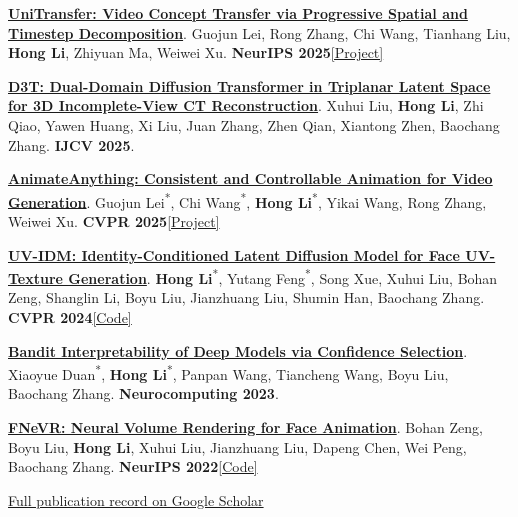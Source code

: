 \documentclass[10pt,a4paper]{article}
\newcommand{\EqContrib}{\textsuperscript{*}}
\newcommand{\reslink}[2]{\href{#1}{\textcolor{accent}{[#2]}}}
\begin{document}
\begin{enumerate}[leftmargin=1.6em,label={[\arabic*]},topsep=6pt,itemsep=7pt,parsep=0pt]
\item \href{https://yu-shaonian.github.io/UniTransfer-Web/}{\textbf{UniTransfer: Video Concept Transfer via Progressive Spatial and Timestep Decomposition}}. Guojun Lei, Rong Zhang, Chi Wang, Tianhang Liu, \textbf{Hong Li}, Zhiyuan Ma, Weiwei Xu. \textcolor{accent}{\textbf{NeurIPS 2025}}\enspace \reslink{https://yu-shaonian.github.io/UniTransfer-Web/}{Project}

\item \href{https://link.springer.com/article/10.1007/s11263-025-02426-2}{\textbf{D3T: Dual-Domain Diffusion Transformer in Triplanar Latent Space for 3D Incomplete-View CT Reconstruction}}. Xuhui Liu, \textbf{Hong Li}, Zhi Qiao, Yawen Huang, Xi Liu, Juan Zhang, Zhen Qian, Xiantong Zhen, Baochang Zhang. \textcolor{accent}{\textbf{IJCV 2025}}.

\item \href{https://yu-shaonian.github.io/Animate_Anything/}{\textbf{AnimateAnything: Consistent and Controllable Animation for Video Generation}}. Guojun Lei\EqContrib, Chi Wang\EqContrib, \textbf{Hong Li}\EqContrib, Yikai Wang, Rong Zhang, Weiwei Xu. \textcolor{accent}{\textbf{CVPR 2025}}\enspace \reslink{https://yu-shaonian.github.io/Animate_Anything/}{Project}

\item \href{https://openaccess.thecvf.com/content/CVPR2024/papers/Li_UV-IDM_Identity-Conditioned_Latent_Diffusion_Model_for_Face_UV-Texture_Generation_CVPR_2024_paper.pdf}{\textbf{UV-IDM: Identity-Conditioned Latent Diffusion Model for Face UV-Texture Generation}}. \textbf{Hong Li}\EqContrib, Yutang Feng\EqContrib, Song Xue, Xuhui Liu, Bohan Zeng, Shanglin Li, Boyu Liu, Jianzhuang Liu, Shumin Han, Baochang Zhang. \textcolor{accent}{\textbf{CVPR 2024}}\enspace \reslink{https://github.com/Luh1124/UV-IDM}{Code}

\item \href{https://www.sciencedirect.com/science/article/pii/S0925231223003739}{\textbf{Bandit Interpretability of Deep Models via Confidence Selection}}. Xiaoyue Duan\EqContrib, \textbf{Hong Li}\EqContrib, Panpan Wang, Tiancheng Wang, Boyu Liu, Baochang Zhang. \textcolor{accent}{\textbf{Neurocomputing 2023}}.

\item \href{https://proceedings.neurips.cc/paper_files/paper/2022/file/8cc7e1509fbfee9cabaacd3ab0bfe2b1-Paper-Conference.pdf}{\textbf{FNeVR: Neural Volume Rendering for Face Animation}}. Bohan Zeng, Boyu Liu, \textbf{Hong Li}, Xuhui Liu, Jianzhuang Liu, Dapeng Chen, Wei Peng, Baochang Zhang. \textcolor{accent}{\textbf{NeurIPS 2022}}\enspace \reslink{https://github.com/zengbohan0217/FNeVR}{Code}
\end{enumerate}
\vspace{3pt}
{\small\href{https://scholar.google.com/citations?user=5FBYzP8AAAAJ}{Full publication record on Google Scholar}}
\end{document}

